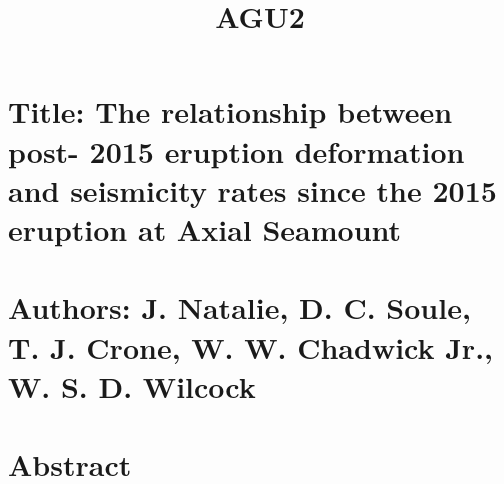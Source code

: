 \documentclass[11pt]{article}
\title{AGU2}
\begin{document}
    
    
    \maketitle
    
    

    
    \hypertarget{title-the-relationship-between-post--2015-eruption-deformation-and-seismicity-rates-since-the-2015-eruption-at-axial-seamount}{%
\section{Title: The relationship between post- 2015 eruption deformation
and seismicity rates since the 2015 eruption at Axial
Seamount}\label{title-the-relationship-between-post--2015-eruption-deformation-and-seismicity-rates-since-the-2015-eruption-at-axial-seamount}}

\hypertarget{authors-j.-natalie-d.-c.-soule-t.-j.-crone-w.-w.-chadwick-jr.-w.-s.-d.-wilcock}{%
\section{Authors: J. Natalie, D. C. Soule, T. J. Crone, W. W. Chadwick
Jr., W. S. D.
Wilcock}\label{authors-j.-natalie-d.-c.-soule-t.-j.-crone-w.-w.-chadwick-jr.-w.-s.-d.-wilcock}}

    \hypertarget{abstract}{%
\section{Abstract}\label{abstract}}
\end{document}
